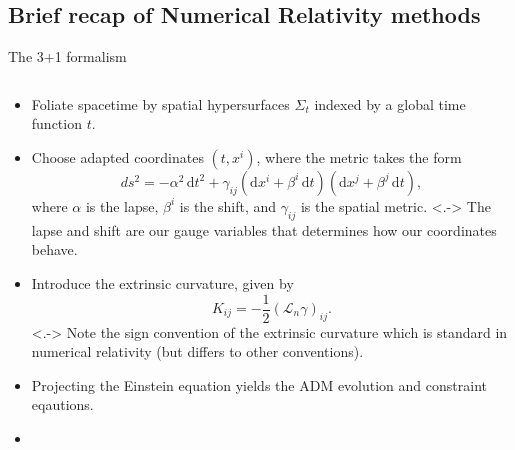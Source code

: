 \documentclass[smaller,aspectratio=169]{beamer}
\newcommand{\rmd}{\mathrm{d}}
\begin{document}
\subsection{Brief recap of Numerical Relativity methods}
\begin{frame}{The 3+1 formalism}
    \begin{columns}
        \begin{column}{0.6\columnwidth}
            \small
            \begin{itemize}
                \note[item]<.->{ 
                    I will go through this quickly as I assume most people here 
                    will have seen this before.}
                \item<+->
                    Foliate spacetime by spatial hypersurfaces $\Sigma_t$ 
                    indexed by a global time function $t$.
                \item<+->
                    Choose \alert{adapted} coordinates $(t,x^i)$, where the 
                    metric takes the form
                    \begin{equation*}
                        ds^2 =  -\alpha^2\,\rmd t^2 + \gamma_{ij}\left(
                            \rmd x^i + \beta^i\, \rmd t\right)\left(\rmd x^j + 
                            \beta^j\, \rmd t\right), 
                    \end{equation*}
                    where $\alpha$ is the \alert{lapse}, $\beta^i$ is the 
                    \alert{shift}, and $\gamma_{ij}$ is the 
                    \alert{spatial metric}.
                \note[item]<.->{
                    The lapse and shift are our gauge variables that determines 
                    how our coordinates behave.}
                \item<+->
                    Introduce the \alert{extrinsic curvature}, given by
                    \begin{equation*}
                        K_{ij} = -\frac{1}{2}(\mathcal{L}_n\gamma)_{ij}.
                    \end{equation*}
                \note[item]<.->{
                    Note the sign convention of the extrinsic curvature which 
                    is standard in numerical relativity (but differs to other 
                    conventions).}
                \item<+->
                    Projecting the Einstein equation yields the 
                    \alert{ADM evolution and constraint} eqautions.
                \item<+->

\end{itemize}
\end{column}
\end{columns}
\end{frame}
\end{document}
